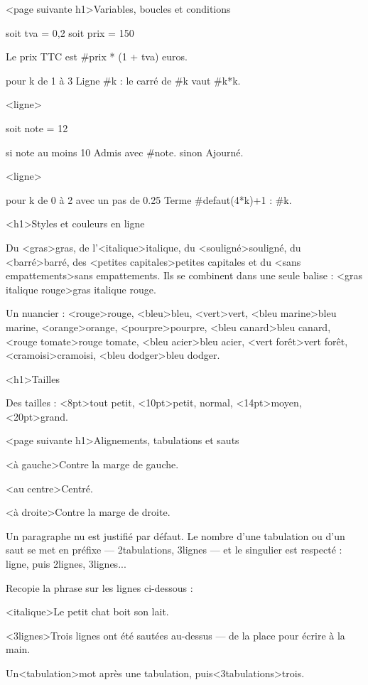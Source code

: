 \documentclass[marges=20, taille=11]{texecole}
\begin{document}
	<page suivante h1>Variables, boucles et conditions
	
	soit tva = 0,2
	soit prix = 150
	
	Le prix TTC est #{prix * (1 + tva)} euros.
	
	pour k de 1 à 3 {
		Ligne #k : le carré de #k vaut #{k*k}.
	}
	
	<ligne>
	
	soit note = 12
	
	si note au moins 10 {
		Admis avec #note.
	} sinon {
		Ajourné.
	}
	
	<ligne>
	
	pour k de 0 à 2 avec un pas de 0.25 {
		Terme #{defaut(4*k)+1} : #k.
	}
	
	<h1>Styles et couleurs en ligne
	
	Du <gras>{gras}, de l'<italique>{italique}, du <souligné>{souligné}, du <barré>{barré}, des <petites capitales>{petites capitales} et du
	<sans empattements>{sans empattements}. Ils se combinent dans une seule
	balise : <gras italique rouge>{gras italique rouge}.
	
	Un nuancier : <rouge>{rouge}, <bleu>{bleu}, <vert>{vert},
	<bleu marine>{bleu marine}, <orange>{orange}, <pourpre>{pourpre},
	<bleu canard>{bleu canard}, <rouge tomate>{rouge tomate},
	<bleu acier>{bleu acier}, <vert forêt>{vert forêt},
	<cramoisi>{cramoisi}, <bleu dodger>{bleu dodger}.
	
	<h1>Tailles
	
	Des tailles : <8pt>{tout petit}, <10pt>{petit}, normal,
	<14pt>{moyen}, <20pt>{grand}.
	
	<page suivante h1>Alignements, tabulations et sauts
	
	<à gauche>Contre la marge de gauche.
	
	<au centre>Centré.
	
	<à droite>Contre la marge de droite.
	
	Un paragraphe nu est justifié par défaut. Le nombre d'une tabulation ou d'un saut se met en préfixe — 2tabulations, 3lignes — et le singulier est respecté : ligne, puis 2lignes, 3lignes...
	
	Recopie la phrase sur les lignes ci-dessous :
	
	<italique>Le petit chat boit son lait.
	
	<3lignes>Trois lignes ont été sautées au-dessus — de la place pour
	écrire à la main.
	
	Un<tabulation>mot après une tabulation, puis<3tabulations>trois.
	
\end{document}
